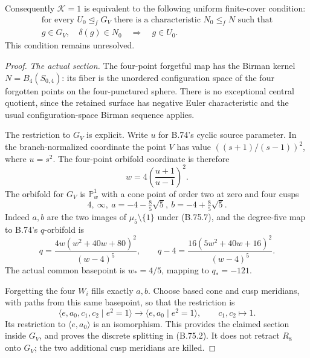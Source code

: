 Consequently \(\mathcal K=1\) is equivalent to the following
uniform finite-cover condition:
\[
\begin{gathered}
 \text{for every }U_0\mathrel{\trianglelefteq_f}G_V
 \text{ there is a characteristic }N_0\leq_fN\text{ such that}\\
       g\in G_V,\quad\delta(g)\in N_0
                    \quad\Longrightarrow\quad g\in U_0.
\end{gathered}                                                   \tag{B.75.6}
\]
This condition remains unresolved.

\begin{proof}
\emph{The actual section.}
The four-point forgetful map has the Birman kernel
\(N=B_4(S_{0,4})\): its fiber is the unordered configuration
space of the four forgotten points on the four-punctured
sphere.  There is no exceptional central quotient, since
the retained surface has negative Euler characteristic and
the usual configuration-space Birman sequence applies.

The restriction to \(G_V\) is explicit.  Write \(u\) for
B.74's cyclic source parameter.  In the branch-normalized
coordinate the point \(V\) has value
\(((s+1)/(s-1))^2\), where \(u=s^2\).
The four-point orbifold coordinate is therefore
\[
 w=4\left(\frac{u+1}{u-1}\right)^2.
                                                               \tag{B.75.7}
\]
The orbifold for \(G_V\) is \(\mathbb P^1_w\) with a cone
point of order two at zero and four cusps
\[
       4,\ \infty,\ a=-4-\tfrac85\sqrt5,\
                         b=-4+\tfrac85\sqrt5.
\]
Indeed \(a,b\) are the two images of
\(\mu_5\setminus\{1\}\) under (B.75.7), and the degree-five
map to B.74's \(q\)-orbifold is
\[
 q=\frac{4w(w^2+40w+80)^2}{(w-4)^5},\qquad
 q-4=\frac{16(5w^2+40w+16)^2}{(w-4)^5}.
                                                               \tag{B.75.8}
\]
The actual common basepoint is \(w_*=4/5\), mapping to
\(q_*=-121\).

Forgetting the four \(W_i\) fills exactly \(a,b\).
Choose based cone and cusp meridians, with paths from this
same basepoint, so that the restriction is
\[
 \langle e,a_0,c_1,c_2\mid e^2=1\rangle
       \longrightarrow\langle e,a_0\mid e^2=1\rangle,
       \qquad c_1,c_2\longmapsto1.
                                                               \tag{B.75.9}
\]
Its restriction to \(\langle e,a_0\rangle\) is an
isomorphism.  This provides the claimed section inside
\(G_V\), and proves the discrete splitting in (B.75.2).
It does not retract \(R_8\) onto \(G_V\); the two additional
cusp meridians are killed.


\end{proof}
